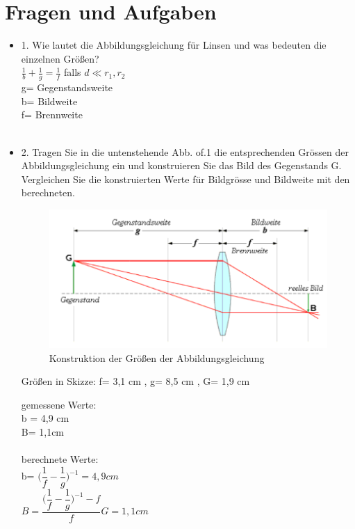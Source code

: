 \section{Fragen und Aufgaben}
\begin{itemize}
	\item 1. Wie lautet die Abbildungsgleichung für Linsen und was bedeuten die einzelnen Größen?\\
	$\frac{1}{b}+\frac{1}{g}=\frac{1}{f}$ falls $d \ll r_1, r_2$\\
	g= Gegenstandsweite \\
	b= Bildweite\\
	f= Brennweite\\ \\
	\item 2. Tragen Sie in die untenstehende Abb. of.1 die entsprechenden Grössen der Abbildungsgleichung	ein und konstruieren Sie das Bild des Gegenstands G. Vergleichen Sie die konstruierten Werte für Bildgrösse und Bildweite mit den berechneten.\\
	
		\begin{figure}[h]
		\includegraphics[width=1\textwidth]{abbildungsgl}
		\caption{Konstruktion der Größen der Abbildungsgleichung} 
	\end{figure}
Größen in Skizze: f= 3,1 cm , g= 8,5 cm , G= 1,9 cm 
	
	gemessene Werte: \\b = 4,9 cm\\B= 1,1cm
	\\\\
	berechnete Werte: \\b= $\Big(\dfrac{1}{f} - \dfrac{1}{g}\Big)^{-1} = 4,9 cm$
\\	$B = \dfrac{\Big(\dfrac{1}{f} - \dfrac{1}{g}\Big)^{-1}-f}{f}G= 1,1 cm   $


\end{itemize}
